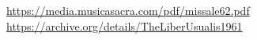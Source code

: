 \tableofcontents

\vspace{\fill}



\vspace{\fill}

\begin{center}
    \url{https://media.musicasacra.com/pdf/missale62.pdf} \\
    \url{https://archive.org/details/TheLiberUsualis1961}
\end{center}
